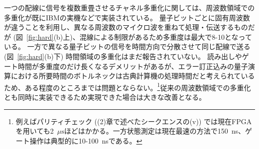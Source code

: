 \documentclass[11pt,a4j,dvipdfmx]{jarticle} 					%
\newcommand{\研究課題名}{誤り耐性量子コンピュータに向けた誤り訂正技術の開発(仮)}
\newcommand{\研究機関名}{東京大学}
\newcommand{\研究代表者氏名}{寺師弘二}
\newcommand{\研究期間の最終元号年度}{10}  %
\newcommand{\mybf}[1]{{\bfseries\sffamily#1}}
\begin{document}
一つの配線に信号を複数重畳させるチャネル多重化に関しては、周波数領域での多重化が既にIBMの実機などで実装されている。
量子ビットごとに固有周波数が違うことを利用し、異なる周波数のマイクロ波を重ねて処理・伝送するものだが (図~\ref{fig:hard}(b)上)、混線による制限があるため多重度は最大で8-10となっている。
一方で異なる量子ビットの信号を時間方向で分散させて同じ配線で送る (図~\ref{fig:hard}(b)下) 時間領域の多重化はまだ報告されていない。
読み出しやゲート時間が多重度のだけ長くなるデメリットがあるが、エラー訂正込みの量子演算における所要時間のボトルネックは古典計算機の処理時間だと考えられているため、ある程度のところまでは問題とならない。\footnote{例えばパリティチェック ((2)章で述べたシークエンスの(v)) では現在FPGAを用いても2~${\mu \mathrm{s}}$ほどはかかる。一方状態測定は現在最速の方法で150~ns、ゲート操作は典型的に10-100~nsである。}従来の周波数領域での多重化とも同時に実装できるため実現できた場合は大きな改善となる。\\


%

\end{document}
